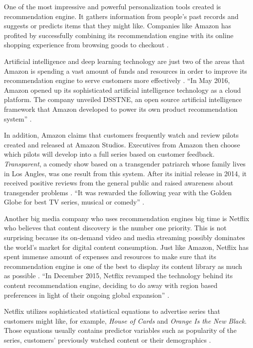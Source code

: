 \documentclass[sigconf]{acmart}
\begin{document}
One of the most impressive and powerful personalization tools created is recommendation engine. It gathers information from people's past records and suggests or predicts items that they might like. Companies like Amazon has profited by successfully combining its recommendation engine with its online shopping experience from browsing goods to checkout \cite{Arora2016battle}.  

Artificial intelligence and deep learning technology are just two of the areas that Amazon is spending a vast amount of funds and resources in order to improve its recommendation engine to serve customers more effectively \cite{Arora2016battle}. ``In May 2016, Amazon opened up its sophisticated artificial intelligence technology as a cloud platform. The company unveiled DSSTNE, an open source artificial intelligence framework that Amazon developed to power its own product recommendation system'' \cite{Arora2016battle}.

In addition, Amazon claims that customers frequently watch and review pilots created and released at Amazon Studios. Executives from Amazon then choose which pilots will develop into a full series based on customer feedback. {\em Transparent}, a comedy show based on a transgender patriarch whose family lives in Los Angles, was one result from this system. After its initial release in 2014, it received positive reviews from the general public and raised awareness about transgender problems \cite{Whitley2016data}. ``It was rewarded the following year with the Golden Globe for best TV series, musical or comedy'' \cite{Whitley2016data}.

Another big media company who uses recommendation engines big time is Netflix who believes that content discovery is the number one priority. This is not surprising because its on-demand video and media streaming possibly dominates the world's market for digital content consumption. Just like Amazon, Netflix has spent immense amount of expenses and resources to make sure that its recommendation engine is one of the best to display its content library as much as possible \cite{Arora2016battle}. ``In December 2015, Netflix revamped the technology behind its content recommendation engine, deciding to do away with region based preferences in light of their ongoing global expansion'' \cite{Arora2016battle}.

Netflix utilizes sophisticated statistical equations to advertise series that customers might like, for example, {\em House of Cards} and {\em Orange Is the New Black}. Those equations usually contains predictor variables such as popularity of the series, customers' previously watched content or their demographics \cite{Whitley2016data}.
\end{document}
